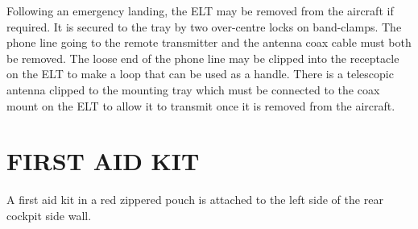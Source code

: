 Following an emergency landing, the ELT may be removed from the aircraft if required. It is secured to the tray by two over-centre locks on band-clamps. The phone line going to the remote transmitter and the antenna coax cable must both be removed. The loose end of the phone line may be clipped into the receptacle on the ELT to make a loop that can be used as a handle. There is a telescopic antenna clipped to the mounting tray which must be connected to the coax mount on the ELT to allow it to transmit once it is removed from the aircraft. 

\section{FIRST AID KIT}
A first aid kit in a red zippered pouch is attached to the left side of the rear cockpit side wall.

\cleardoublepage 
